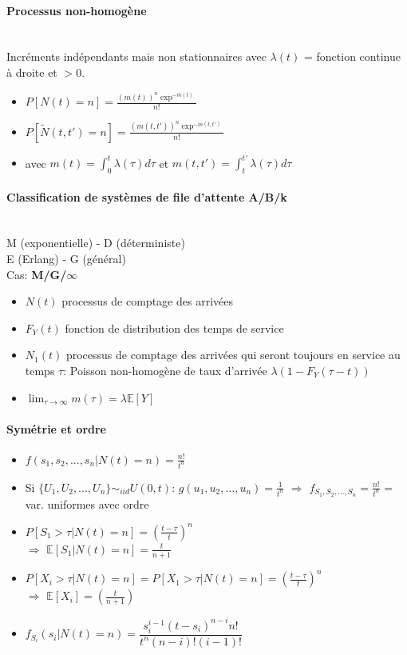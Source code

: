 \documentclass[paper=a4,fontsize=8pt,pagesize,DIV=calc]{scrartcl}
\newcounter{row}
\begin{document}
\begin{multicols}{3}
\paragraph{Processus non-homogène}~~\\
Incréments indépendants mais non stationnaires avec
$\lambda(t)$ = fonction continue  à droite et $>0$.
\begin{itemize}
\item $P[N(t) = n] =\frac{(m(t))^n\exp^{-m(t)}}{n!}$ 
\item  $P[\tilde{N} (t, t') = n] =\frac{(m(t, t'))^n\exp^{-m(t,t')}}{n!}$
\item avec $m(t) = \int_0^t \lambda(\tau) d\tau$ et $m(t, t') = \int_t^{t'} \lambda(\tau) d\tau$
\end{itemize}
\paragraph{Classification de systèmes de file d'attente A/B/k}~~\\
M (exponentielle) - D (déterministe)\\
E (Erlang) - G (général)\\
Cas: \textbf{M/G/$\infty$}
\begin{itemize}
\item $N(t)$ processus de comptage des arrivées
\item $F_Y(t)$ fonction de distribution des temps de service
\item $N_1(t)$ processus de comptage des arrivées qui seront toujours en service au temps $\tau$: Poisson non-homogène de taux d'arrivée $\lambda(1 - F_Y (\tau - t))$
\item $\lim_{\tau\to \infty}m(\tau)=\lambda \mathbb{E}[Y]$
\end{itemize}
\paragraph{Symétrie et ordre}
\begin{itemize}
\item $f(s_1, s_2, ... , s_n|N(t) = n) =  \frac{
n!}{t^n}$
\item Si $\{U_1, U_2, . . . , U_n\} \sim_{iid} U(0,t)$: $g(u_1, u_2, . . . , u_n) = \frac{1}{t^n}$ $\Rightarrow $ $f_{S_1,S_2,...,S_n} =\frac{n!}{t^n}$ = var. uniformes avec ordre
\item $P[S_1 > \tau |N(t) = n]=(\frac{t-\tau}{t})^n$\\ $\Rightarrow$ $\mathbb{E}[S_1|N(t) = n] =\frac{t}{n+1}$
\item $P[X_i > \tau |N(t) = n]=P[X_1 > \tau |N(t) = n]=(\frac{t-\tau}{t})^n$\\ $\Rightarrow$ $\mathbb{E}[X_i]=(\frac{t}{n+1})$
\item $f_{S_i}(s_i|N(t) = n)=\dfrac{s_i^{i-1}(t- s_i)^{n-i} n!}{t^n(n-i)!(i-1)!}$
\end{itemize}

\end{multicols}
\end{document}
